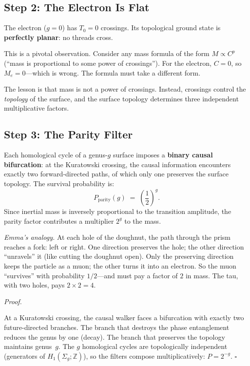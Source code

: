 \documentclass[11pt, a4paper, openany]{book}
\newcounter{thm}[chapter]
\renewenvironment{proof}[1][Proof]{%
  \par\noindent\textit{#1.}\quad
}{\hfill$\square$\par\medskip}
\begin{document}
\subsection{Step 2: The Electron Is Flat}

\begin{corollary}
\label{cor:electron-planar}
The electron ($g = 0$) has $T_0 = 0$ crossings. Its topological
ground state is \textbf{perfectly planar}: no threads cross.
\end{corollary}

\noindent This is a pivotal observation. Consider any mass formula of
the form $M \propto C^p$ (``mass is proportional to some power of
crossings''). For the electron, $C = 0$, so $M_e = 0$---which is
wrong.  The formula must take a different form.

The lesson is that mass is not a power of crossings.  Instead,
crossings control the \emph{topology} of the surface, and the surface
topology determines three independent multiplicative factors.

\subsection{Step 3: The Parity Filter}

\begin{theorem}
\label{thm:parity-filter}
Each homological cycle of a genus-$g$ surface imposes a
\textbf{binary causal bifurcation}: at the Kuratowski crossing, the
causal information encounters exactly two forward-directed paths,
of which only one preserves the surface topology. The survival
probability is:
\[
  P_{\mathrm{parity}}(g) \;=\; \left(\frac{1}{2}\right)^{\!g}.
\]
Since inertial mass is inversely proportional to the transition
amplitude, the parity factor contributes a multiplier $2^g$ to
the mass.
\end{theorem}

\smallskip\noindent
\textit{Emma's analogy.}
At each hole of the doughnut, the path through the prism reaches a
fork: left or right. One direction preserves the hole; the other
direction ``unravels'' it (like cutting the doughnut open). Only
the preserving direction keeps the particle as a muon; the other
turns it into an electron. So the muon ``survives'' with probability
$1/2$---and must pay a factor of $2$ in mass.
The tau, with two holes, pays $2 \times 2 = 4$.

\begin{proof}
At a Kuratowski crossing, the causal walker faces a bifurcation
with exactly two future-directed branches. The branch that destroys
the phase entanglement reduces the genus by one (decay).
The branch that preserves the topology maintains genus~$g$. The
$g$ homological cycles are topologically independent (generators
of $H_1(\Sigma_g; \mathbb{Z})$), so the filters compose
multiplicatively: $P = 2^{-g}$.
\end{proof}
\end{document}
